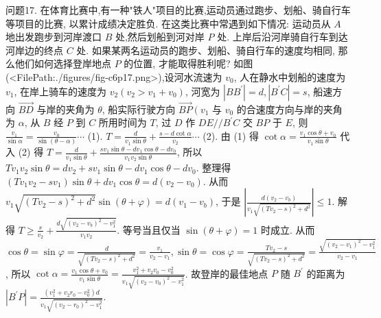 问题17. 在体育比赛中,有一种"铁人"项目的比赛,运动员通过跑步、划船、骑自行车等项目的比赛, 以累计成绩决定胜负.
在这类比赛中常遇到如下情况: 运动员从 $A$ 地出发跑步到河岸渡口 $B$ 处,然后划船到河对岸 $P$ 处.
上岸后沿河岸骑自行车到达河岸边的终点 $C$ 处.
如果某两名运动员的跑步、划船、骑自行车的速度均相同, 那么他们如何选择登岸地点 $P$ 的位置, 才能取得胜利呢?
如图(<FilePath:./figures/fig-c6p17.png>),设河水流速为 $v_0$, 人在静水中划船的速度为 $v_1$, 在岸上骑车的速度为 $v_2\left(v_2>v_1+v_0\right)$, 河宽为 $\left|B B^{\prime}\right|=d,\left|B^{\prime} C\right|=s$, 船速方向 $\overrightarrow{B D}$ 与岸的夹角为 $\theta$, 船实际行驶方向 $\overrightarrow{B P}\left(v_1\right.$ 与 $v_0$ 的合速度方向与岸的夹角为 $\alpha$, 从 $B$ 经 $P$ 到 $C$ 所用时间为 $T$, 过 $D$ 作 $D E / / B^{\prime} C$ 交 $B P$ 于 $E$, 则 $\frac{v_1}{\sin \alpha}=\frac{v_0}{\sin (\theta-\alpha)} \cdots$ (1).
$T=\frac{d}{v_1 \sin \theta}+\frac{s-d \cot \alpha}{v_2} \cdots$ (2). 由 (1) 得 $\cot \alpha=\frac{v_1 \cos \theta+v_0}{v_1 \sin \theta}$ 代入 (2) 得 $T= \frac{d}{v_1 \sin \theta}+\frac{s v_1 \sin \theta-d v_1 \cos \theta-d v_0}{v_1 v_2 \sin \theta}$, 所以 $T v_1 v_2 \sin \theta=d v_2+s v_1 \sin \theta- d v_1 \cos \theta-d v_0$. 整理得 $\left(T v_1 v_2-s v_1\right) \sin \theta+d v_1 \cos \theta=d\left(v_2-v_0\right)$. 从而 $v_1 \sqrt{\left(T v_2-s\right)^2+d^2} \sin (\theta+\varphi)=d\left(v_1-v_b\right)$, 于是 $\left|\frac{d\left(v_2-v_b\right)}{v_1 \sqrt{\left(T v_2-s\right)^2+d^2}}\right| \leqslant 1$. 
解得 $T \geqslant \frac{s}{v_2}+\frac{d \sqrt{\left(v_2-v_b\right)^2-v_1^2}}{v_1 v_2}$. 等号当且仅当 $\sin (\theta+\varphi)=1$ 时成立.
从而 $\cos \theta= \sin \varphi=\frac{d}{\sqrt{\left(T v_2-s\right)^2+d^2}}=\frac{v_1}{v_2-v_1}, \sin \theta=\cos \varphi=\frac{T v_2-s}{\sqrt{\left(T v_2-s\right)^2+d^2}}= \frac{\sqrt{\left(v_2-v_1\right)^2-v_1^2}}{v_2-v_1}$, 所以 $\cot \alpha=\frac{v_1 \cos \theta+v_0}{v_1 \sin \theta}=\frac{v_1^2+v_2 v_0-v_0^2}{v_1 \sqrt{\left(v_2-v_0\right)^2-v_1^2}}$. 故登岸的最佳地点 $P$ 随 $B^{\prime}$ 的距离为 $\left|B^{\prime} P\right|=\frac{\left(v_1^2+v_2 r_0-v_0^2\right) d}{v_1 \sqrt{\left(v_2-r_0\right)^2-v_1^2}}$.



